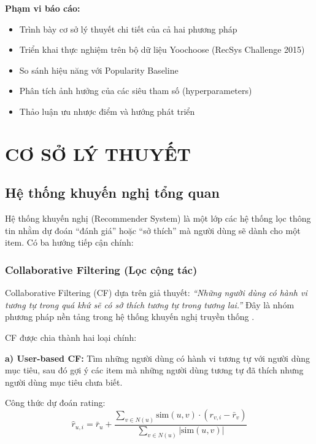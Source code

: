 \documentclass[12pt, a4paper]{article}
\begin{document}
\textbf{Phạm vi báo cáo:}
\begin{itemize}
    \item Trình bày cơ sở lý thuyết chi tiết của cả hai phương pháp
    \item Triển khai thực nghiệm trên bộ dữ liệu Yoochoose (RecSys Challenge 2015)
    \item So sánh hiệu năng với Popularity Baseline
    \item Phân tích ảnh hưởng của các siêu tham số (hyperparameters)
    \item Thảo luận ưu nhược điểm và hướng phát triển
\end{itemize}

\newpage


\section{CƠ SỞ LÝ THUYẾT}
\label{chap:theory}

\subsection{Hệ thống khuyến nghị tổng quan}

Hệ thống khuyến nghị (Recommender System) là một lớp các hệ thống lọc thông tin nhằm dự đoán ``đánh giá'' hoặc ``sở thích'' mà người dùng sẽ dành cho một item. Có ba hướng tiếp cận chính:

\subsubsection{Collaborative Filtering (Lọc cộng tác)}

Collaborative Filtering (CF) dựa trên giả thuyết: \textit{``Những người dùng có hành vi tương tự trong quá khứ sẽ có sở thích tương tự trong tương lai.''} Đây là nhóm phương pháp nền tảng trong hệ thống khuyến nghị truyền thống \cite{koren2009, sarwar2001}.

CF được chia thành hai loại chính:

\textbf{a) User-based CF:} Tìm những người dùng có hành vi tương tự với người dùng mục tiêu, sau đó gợi ý các item mà những người dùng tương tự đã thích nhưng người dùng mục tiêu chưa biết.

Công thức dự đoán rating:
\begin{equation}
    \hat{r}_{u,i} = \bar{r}_u + \frac{\sum_{v \in N(u)} \text{sim}(u,v) \cdot (r_{v,i} - \bar{r}_v)}{\sum_{v \in N(u)} |\text{sim}(u,v)|}
    \label{eq:usercf}
\end{equation}
\end{document}
